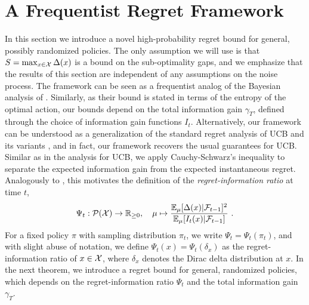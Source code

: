 \section{A Frequentist Regret Framework}\label{section: general regret framework}
In this section we introduce a novel high-probability regret bound for general, possibly randomized policies.  The only assumption we will use is that $S = \max_{x \in \mathcal{X}} \Delta(x)$ is a bound on the sub-optimality gaps, and we emphasize that the results of this section are independent of any assumptions on the noise process. The framework can be seen as a frequentist analog of the Bayesian analysis of \cite{RussoLearningOptimizeInformationDirected2014}. Similarly, as their bound is stated in terms of the entropy of the optimal action, our bounds depend on the total information gain $\gamma_T$, defined through the choice of information gain functions $I_t$. Alternatively, our framework can be understood as a generalization of the standard regret analysis of UCB and its variants \cite[]{Abbasi-YadkoriImprovedAlgorithmsLinear2011, SrinivasGaussianProcessOptimization2010}, and in fact, our framework recovers the usual guarantees for UCB. Similar as in the analysis for UCB, we apply Cauchy-Schwarz's inequality to separate the expected {information gain} from the expected instantaneous regret. Analogously to \cite{RussoLearningOptimizeInformationDirected2014}, this motivates the definition of the \emph{regret-information ratio} at time $t$, 
\begin{align}
\Psi_t: \mathcal{P}(\mathcal{X}) \rightarrow \mathbb{R}_{\geq 0}, \quad \mu \mapsto \frac{\mathbb{E}_\mu[\Delta(x)|\mathcal{F}_{t-1}]^2}{\mathbb{E}_\mu[I_t(x)|\mathcal{F}_{t-1}]} \text{ .}
\end{align}	
For a fixed policy $\pi$ with sampling distribution $\pi_t$, we write $\Psi_t = \Psi_t(\pi_t)$, and with slight abuse of notation, we define $\Psi_t(x) = \Psi_t(\delta_x)$ as the regret-information ratio of $x \in \mathcal{X}$, where $\delta_x$ denotes the Dirac delta distribution at $x$. In the next theorem, we introduce a regret bound for general, randomized policies, which depends on the regret-information ratio $\Psi_t$ and the total information gain $\gamma_T$.
